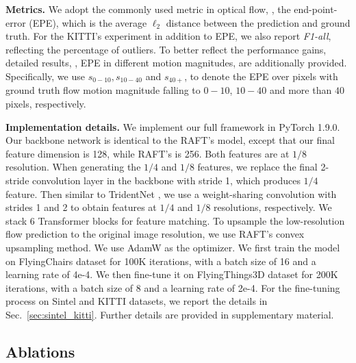 \documentclass[10pt,twocolumn,letterpaper]{article}
\begin{document}
{\bf Metrics.} We adopt the commonly used metric in optical flow, \ie, the end-point-error (EPE), which is the average $\ell_2$ distance between the prediction and ground truth. For the KITTI's experiment in addition to EPE, we also report \emph{F1-all}, reflecting the percentage of outliers. To better reflect the performance gains, detailed results, \ie, EPE in different motion magnitudes, are additionally provided. 
Specifically, we use $s_{0-10}, s_{10-40}$ and $s_{40+}$, to denote the EPE over pixels with ground truth flow motion magnitude falling to $0-10$, $10-40$ and more than $40$ pixels, respectively.



{\bf Implementation details.} We implement our full framework in PyTorch 1.9.0. Our backbone network is identical to the RAFT's model, except that our final feature dimension is 128, while RAFT's is 256. Both features are at $1/8$ resolution. When generating the $1/4$ and $1/8$ features, we replace the final 2-stride convolution layer in the backbone with stride 1, which produces $1/4$ feature. Then similar to TridentNet \cite{li2019scale}, we use a weight-sharing convolution with strides 1 and 2 to obtain features at $1/4$ and $1/8$ resolutions, respectively. We stack 6 Transformer blocks for feature matching. To upsample the low-resolution flow prediction to the original image resolution, we use RAFT's convex upsampling \cite{teed2020raft} method. We use AdamW \cite{loshchilov2017decoupled} as the optimizer. We first train the model on FlyingChairs dataset for 100K iterations, with a batch size of 16 and a learning rate of 4e-4. We then fine-tune it on FlyingThings3D dataset for 200K iterations, with a batch size of 8 and a learning rate of 2e-4. For the fine-tuning process on Sintel and KITTI datasets, we report the details in Sec.~\ref{sec:sintel_kitti}. Further details are provided in supplementary material.








\subsection{Ablations}
\label{sec:ablation}
\end{document}
